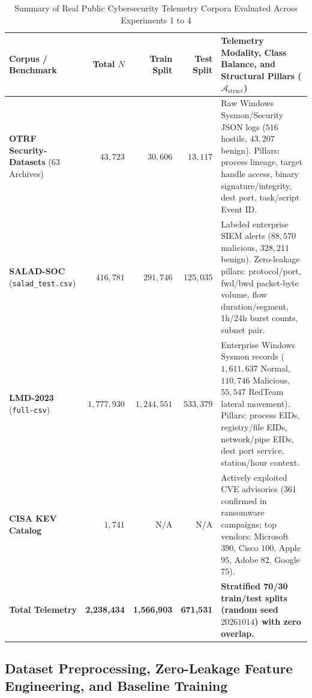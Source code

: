 \documentclass[11pt,a4paper]{article}
\let\oldtexttt\texttt
\renewcommand{\texttt}[1]{\textnormal{\oldtexttt{#1}}}
\begin{document}
\begin{table}[!htbp]
\centering
\singlespacing
\caption{Summary of Real Public Cybersecurity Telemetry Corpora Evaluated Across Experiments 1 to 4}
\label{tab:corpora_summary}
\footnotesize
\setlength{\tabcolsep}{3.6pt}
\begin{tabular}{L{2.8cm} r r r L{6.2cm}}
\toprule
\textbf{Corpus / Benchmark} & \textbf{Total $N$} & \textbf{Train Split} & \textbf{Test Split} & \textbf{Telemetry Modality, Class Balance, and Structural Pillars ($\mathcal{A}_{\text{struct}}$)} \\
\midrule
\textbf{OTRF Security-Datasets} (63 Archives) & $43,723$ & $30,606$ & $13,117$ & Raw Windows Sysmon/Security JSON logs ($516$ hostile, $43,207$ benign). Pillars: process lineage, target handle access, binary signature/integrity, dest port, task/script Event ID. \\
\addlinespace[2pt]
\textbf{SALAD-SOC} (\texttt{salad\_test.csv}) & $416,781$ & $291,746$ & $125,035$ & Labeled enterprise SIEM alerts ($88,570$ malicious, $328,211$ benign). Zero-leakage pillars: protocol/port, fwd/bwd packet-byte volume, flow duration/segment, 1h/24h burst counts, subnet pair. \\
\addlinespace[2pt]
\textbf{LMD-2023} (\texttt{full-csv}) & $1,777,930$ & $1,244,551$ & $533,379$ & Enterprise Windows Sysmon records ($1,611,637$ Normal, $110,746$ Malicious, $55,547$ RedTeam lateral movement). Pillars: process EIDs, registry/file EIDs, network/pipe EIDs, dest port service, station/hour context. \\
\addlinespace[2pt]
\textbf{CISA KEV Catalog} & $1,741$ & N/A & N/A & Actively exploited CVE advisories ($361$ confirmed in ransomware campaigns; top vendors: Microsoft $390$, Cisco $100$, Apple $95$, Adobe $82$, Google $75$). \\
\midrule
\textbf{Total Telemetry} & \textbf{2,238,434} & \textbf{1,566,903} & \textbf{671,531} & \textbf{Stratified 70/30 train/test splits (random seed $20261014$) with zero overlap.} \\
\bottomrule
\end{tabular}
\end{table}

\subsection{Dataset Preprocessing, Zero-Leakage Feature Engineering, and Baseline Training}
\label{subsec:method_preprocessing}
\end{document}
